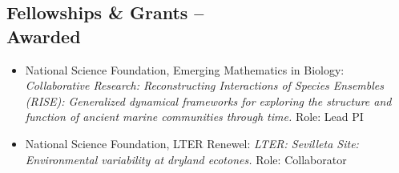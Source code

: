 \documentclass[margin,line,12pt]{res}
\begin{document}
\begin{resume}







\section{\sc Fellowships \& Grants -- \\ Awarded}
\begin{itemize}
\item National Science Foundation, Emerging Mathematics in Biology: \emph{Collaborative Research: Reconstructing Interactions of Species Ensembles (RISE): Generalized dynamical frameworks for exploring the structure and function of ancient marine communities through time.} Role: Lead PI


\item National Science Foundation, LTER Renewel: \emph{LTER: Sevilleta Site: Environmental variability at dryland ecotones.} Role: Collaborator


\end{itemize}
\end{resume}
\end{document}
